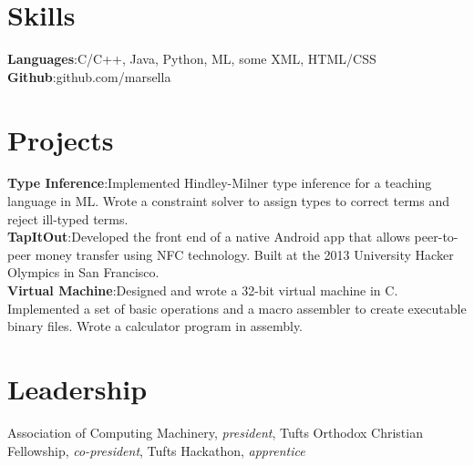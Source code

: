 \documentclass{article}
\newcommand{\skill}[2]{
  \textbf{#1}:#2
}
\begin{document}
\section{Skills}
  \skill{Languages}
        {C/C++, Java, Python, ML, some XML, HTML/CSS} \\
  \skill{Github}
        {github.com/marsella}

\section{Projects}
  \skill{Type Inference}
        {Implemented Hindley-Milner type inference for a teaching language in
        ML. Wrote a constraint solver to assign types to correct terms and
        reject ill-typed terms.} \\
  \skill{TapItOut}
        {Developed the front end of a native Android app that allows
        peer-to-peer money transfer using NFC technology. Built at the 2013
        University Hacker Olympics in San Francisco.} \\
  \skill{Virtual Machine}
        {Designed and wrote a 32-bit virtual machine in C. Implemented a set of
        basic operations and a macro assembler to create executable binary
        files. Wrote a calculator program in assembly.}

\section{Leadership}
  Association of Computing Machinery, \textit{president}, Tufts Orthodox
  Christian Fellowship, \textit{co-president}, Tufts Hackathon,
  \textit{apprentice}
\end{document}
